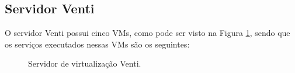 \subsection{Servidor Venti}
\label{section:serv_venti}

O servidor Venti possui cinco \ac{VM}s, como pode ser visto na Figura \ref{fig:servidor_venti}, sendo que os serviços executados nessas \ac{VM}s
são os seguintes:

\begin{figure}[h!]
 \centering
 \caption{Servidor de virtualização Venti.}
 \label{fig:servidor_venti}
\end{figure}

